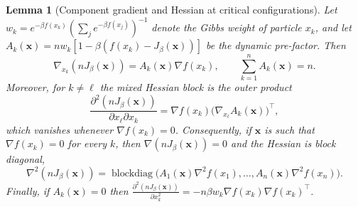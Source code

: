\documentclass{article}
\theoremstyle{plain}
\newtheorem{lemma}[theorem]{Lemma}
\theoremstyle{definition}
\theoremstyle{remark}
\newcommand{\prefactor}[2]{A_{#1}(#2)}
\newcommand{\xx}{\mathbf{x}}
\begin{document}
\begin{lemma}[Component gradient and Hessian at critical configurations]
    \label{lem:derivative-of-J-proof}
    Let $w_k = e^{-\beta f(x_k)}(\sum_j e^{-\beta f(x_j)})^{-1}$ denote the Gibbs weight of particle $x_k$, and let $\prefactor{k}{\xx} = nw_k\left[1 - \beta(f(x_k) - J_\beta(\xx))\right]$ be the dynamic pre-factor. Then
    \begin{equation}
        \nabla_{x_k} (nJ_\beta(\xx)) = \prefactor{k}{\xx} \nabla f(x_k),
        \qquad
        \sum_{k=1}^n \prefactor{k}{\xx} = n.
        \label{eq:lemma-gradient}
    \end{equation}
    Moreover, for $k \neq \ell$ the mixed Hessian block is the outer product
    \begin{equation}
        \frac{\partial^2 (nJ_\beta(\xx))}{\partial x_\ell \partial x_k} = \nabla f(x_k)\bigl(\nabla_{x_\ell}\prefactor{k}{\xx}\bigr)^\top,
        \label{eq:mixed-block}
    \end{equation}
    which vanishes whenever $\nabla f(x_k)=0$. Consequently, if $\xx$ is such that $\nabla f(x_k)=0$ for every $k$, then $\nabla(nJ_\beta(\xx))=0$ and the Hessian is block diagonal,
    \begin{equation}
        \nabla^2(nJ_\beta(\xx)) = \operatorname{blockdiag}\bigl(\prefactor{1}{\xx}\nabla^2 f(x_1),\dots,\prefactor{n}{\xx}\nabla^2 f(x_n)\bigr).
        \label{eq:block-diagonal-hessian}
    \end{equation}
    Finally, if $\prefactor{k}{\xx}=0$ then $\frac{\partial^2(nJ_\beta(\xx))}{\partial x_k^2} = -n\beta w_k \nabla f(x_k)\nabla f(x_k)^\top$.
\end{lemma}
\end{document}
